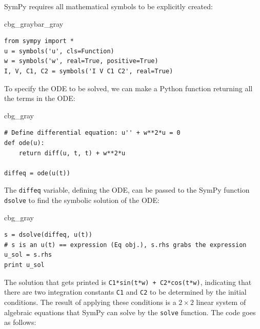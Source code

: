 \documentclass[graybox,envcountchap,sectrefs,final]{svmonodo}
\newenvironment{_cod_tight}[1]{
   \def\FrameCommand{\colorbox{#1}}
   \FrameRule0.6pt\MakeFramed {\FrameRestore}\vskip3mm}
   {\vskip0mm\endMakeFramed}
\newenvironment{cod}[1]{
\bgroup\rmfamily
\fboxsep=0mm\relax
\begin{_cod_tight}{#1}
\list{}{\parsep=-2mm\parskip=0mm\topsep=0pt\leftmargin=2mm
\rightmargin=2\leftmargin\leftmargin=4pt\relax}
\item\relax}
{\endlist\end{_cod_tight}\egroup}
\newenvironment{_pro_tight}[2]{
   \def\FrameCommand{\color{#2}\vrule width 1mm\normalcolor\colorbox{#1}}
   \FrameRule0.6pt\MakeFramed {\advance\hsize-2mm\FrameRestore}\vskip3mm}
   {\vskip0mm\endMakeFramed}
\newenvironment{pro}[2]{
\bgroup\rmfamily
\fboxsep=0mm\relax
\begin{_pro_tight}{#1}{#2}
\list{}{\parsep=-2mm\parskip=0mm\topsep=0pt\leftmargin=2mm
\rightmargin=2\leftmargin\leftmargin=4pt\relax}
\item\relax}
{\endlist\end{_pro_tight}\egroup}
\begin{document}
SymPy requires all mathematical symbols to be explicitly created:

\begin{pro}{cbg_gray}{bar_gray}\begin{Verbatim}[numbers=none,fontsize=\fontsize{9pt}{9pt},baselinestretch=0.95,xleftmargin=2mm]
from sympy import *
u = symbols('u', cls=Function)
w = symbols('w', real=True, positive=True)
I, V, C1, C2 = symbols('I V C1 C2', real=True)
\end{Verbatim}
\end{pro}
\noindent
To specify the ODE to be solved, we can make a Python function returning
all the terms in the ODE:

\begin{cod}{cbg_gray}\begin{Verbatim}[numbers=none,fontsize=\fontsize{9pt}{9pt},baselinestretch=0.95,xleftmargin=2mm]
# Define differential equation: u'' + w**2*u = 0
def ode(u):
    return diff(u, t, t) + w**2*u

diffeq = ode(u(t))
\end{Verbatim}
\end{cod}
\noindent
The \texttt{diffeq} variable, defining the ODE, can be passed to the SymPy
function \texttt{dsolve} to find the symbolic solution of the ODE:

\begin{cod}{cbg_gray}\begin{Verbatim}[numbers=none,fontsize=\fontsize{9pt}{9pt},baselinestretch=0.95,xleftmargin=2mm]
s = dsolve(diffeq, u(t))
# s is an u(t) == expression (Eq obj.), s.rhs grabs the expression
u_sol = s.rhs
print u_sol
\end{Verbatim}
\end{cod}
\noindent
The solution that gets printed is \texttt{C1*sin(t*w) + C2*cos(t*w)}, indicating
that there are two integration constants \texttt{C1} and \texttt{C2} to be determined
by the initial conditions. The result of applying these conditions is
a $2\times 2$ linear system of algebraic equations that SymPy can solve
by the \texttt{solve} function. The code goes as follows:
\end{document}
